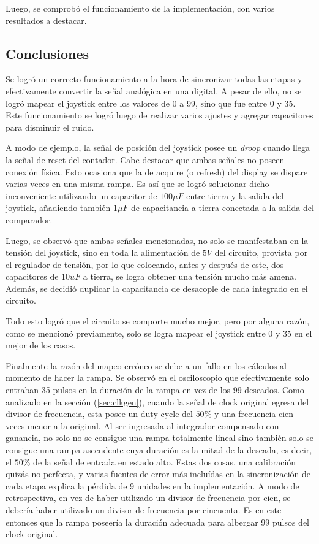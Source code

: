 Luego, se comprobó el funcionamiento de la implementación, con varios resultados a destacar.

\subsection{Conclusiones}

Se logró un correcto funcionamiento a la hora de sincronizar todas las etapas y efectivamente convertir la señal analógica en una digital. A pesar de ello, no se logró mapear el joystick entre los valores de 0 a 99, sino que fue entre 0 y 35. Este funcionamiento se logró luego de realizar varios ajustes y agregar capacitores para disminuir el ruido.

A modo de ejemplo, la señal de posición del joystick posee un \textit{droop} cuando llega la señal de reset del contador. Cabe destacar que ambas señales no poseen conexión física. Esto ocasiona que la de acquire (o refresh) del display se dispare varias veces en una misma rampa. Es así que se logró solucionar dicho inconveniente utilizando un capacitor de $100\mu F$ entre tierra y la salida del joystick, añadiendo también $1\mu F$ de capacitancia a tierra conectada a la salida del comparador.

Luego, se observó que ambas señales mencionadas, no solo se manifestaban en la tensión del joystick, sino en toda la alimentación de $5V$ del circuito, provista por el regulador de tensión, por lo que colocando, antes y después de este, dos capacitores de $10uF$ a tierra, se logra obtener una tensión mucho más amena. Además, se decidió duplicar la capacitancia de desacople de cada integrado en el circuito.

Todo esto logró que el circuito se comporte mucho mejor, pero por alguna razón, como se mencionó previamente, solo se logra mapear el joystick entre 0 y 35 en el mejor de los casos.

Finalmente la razón del mapeo erróneo se debe a un fallo en los cálculos al momento de hacer la rampa. Se observó en el osciloscopio que efectivamente solo entraban 35 pulsos en la duración de la rampa en vez de los 99 deseados. Como analizado en la sección (\ref{sec:clkgen}), cuando la señal de clock original egresa del divisor de frecuencia, esta posee un duty-cycle del $50\%$ y una frecuencia cien veces menor a la original. Al ser ingresada al integrador compensado con ganancia, no solo no se consigue una rampa totalmente lineal sino también solo se consigue una rampa ascendente cuya duración es la mitad de la deseada, es decir, el $50\%$ de la señal de entrada en estado alto. Estas dos cosas, una calibración quizás no perfecta, y varias fuentes de error más incluídas en la sincronización de cada etapa explica la pérdida de 9 unidades en la implementación. A modo de retrospectiva, en vez de haber utilizado un divisor de frecuencia por cien, se debería haber utilizado un divisor de frecuencia por cincuenta. Es en este entonces que la rampa poseería la duración adecuada para albergar $99$ pulsos del clock original.


